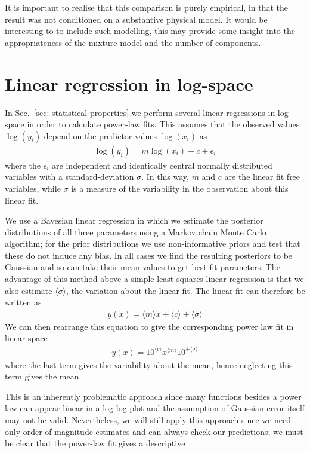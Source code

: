 \documentclass[../full_thesis/full_thesis.tex]{subfiles}
\begin{document}
\begin{subappendices}
It is important to realise that this comparison is purely
empirical, in that the result was not conditioned on a substantive physical
model. It would be interesting to to include such modelling, this may provide some
insight into the appropriateness of the mixture model and the number of
components.

\section{Linear regression in log-space}
\label{sec: linear regression in log-space}
In Sec.~\ref{sec: statistical properties} we perform several linear regressions
in log-space in order to calculate power-law fits. This assumes that the observed
values $\log(y_i)$ depend on the predictor values $\log(x_{i})$ as
\begin{align}
\log(y_i) = m \log(x_i) + c + \epsilon_i
\label{eqn: linear regression}
\end{align}
where the $\epsilon_i$ are independent and
identically central normally  distributed variables with a standard-deviation $\sigma$.
In this way, $m$ and $c$ are the linear fit free variables, while $\sigma$ is
a measure of the variability in the observation about this linear fit.

We use a Bayesian linear regression in which we estimate the posterior distributions
of all three parameters using a Markov chain Monte Carlo algorithm; for the prior
distributions we use non-informative priors and test that these do not induce
any bias. In all cases we find the resulting posteriors to be Gaussian and so
can take their mean values to get best-fit parameters.
The advantage of this
method above a simple least-squares linear regression is that we also estimate
$\langle\sigma\rangle$, the variation about the linear fit. The linear fit can
therefore be written as
\begin{align}
y(x) = \langle m \rangle x + \langle c \rangle \pm \langle \sigma \rangle
\end{align}
We can then rearrange this equation to give the corresponding power law fit
in linear space
\begin{align}
y(x) = 10^{\langle c\rangle}x^{\langle m \rangle} 10^{\pm \langle\sigma\rangle}
\end{align}
where the last term gives the variability about the mean, hence neglecting
this term gives the mean.

This is an inherently problematic approach since many functions besides a
power law can appear linear in a log-log plot and the assumption of
Gaussian error itself may not be valid. Nevertheless, we will still apply this
approach since we need only order-of-magnitude estimates and can always check
our predictions; we must be clear that the power-law fit gives a descriptive



\end{subappendices}
\end{document}
